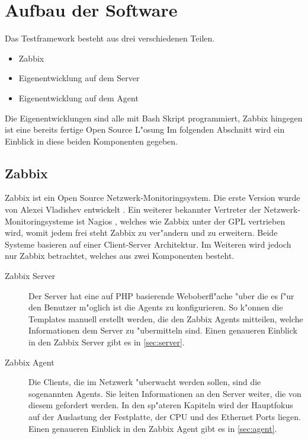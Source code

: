    


\section{Aufbau der Software} \label{sec:aufbauSoftware}
Das Testframework besteht aus drei verschiedenen Teilen. %
\begin{itemize}
\item Zabbix %
\item Eigenentwicklung auf dem Server %
\item Eigenentwicklung auf dem Agent %
\end{itemize}
Die Eigenentwicklungen sind alle mit Bash Skript programmiert, Zabbix hingegen ist eine bereits fertige Open Source L"osung %
Im folgenden Abschnitt wird ein Einblick in diese beiden Komponenten gegeben. %

\subsection{Zabbix}
Zabbix ist ein Open Source Netzwerk-Monitoringsystem. Die erste Version wurde von \mbox{Alexei} Vladishev entwickelt \autocite{zabbix:Web}. %
Ein weiterer bekannter Vertreter der Netzwerk-Monitoringsysteme ist Nagios \autocite{wiki:Nagios}, welches wie Zabbix unter der GPL vertrieben %
wird, womit jedem frei steht Zabbix zu ver"andern und zu erweitern.  %
Beide Systeme basieren auf einer Client-Server Architektur. Im Weiteren wird jedoch nur Zabbix betrachtet, %
welches aus zwei Komponenten besteht. %

\begin{description}
\item[Zabbix Server]Der Server hat eine auf PHP basierende Weboberfl"ache "uber die es f"ur den Benutzer m"oglich ist die Agents zu %
konfigurieren. So k"onnen die Templates manuell erstellt werden, die den Zabbix Agents mitteilen, welche Informationen dem %
Server zu "ubermitteln sind. Einen genaueren Einblick in den Zabbix Server gibt es in \cref{sec:server}. %
\item[Zabbix Agent]Die Clients, die im Netzwerk "uberwacht werden sollen, sind die sogenannten Agents. Sie  %
leiten Informationen an den Server weiter, die von diesem gefordert werden. In den sp"ateren Kapiteln wird der Hauptfokus auf der %
Auslastung der Festplatte, der CPU und des Ethernet Ports liegen. %
Einen genaueren Einblick in den Zabbix Agent gibt es in \cref{sec:agent}. %
\end{description} 


